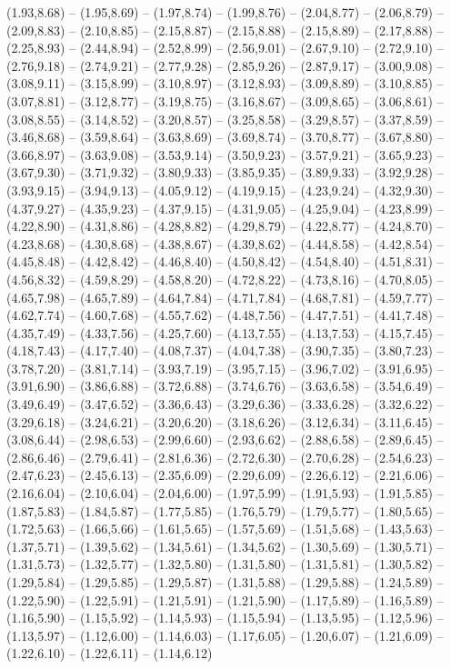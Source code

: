 \expandafter\def\csname geo:gebiet:DE-NW\endcsname{
  (1.93,8.68) -- (1.95,8.69) -- (1.97,8.74) -- (1.99,8.76) -- (2.04,8.77) -- (2.06,8.79) -- (2.09,8.83) -- (2.10,8.85) -- (2.15,8.87) -- (2.15,8.88) -- (2.15,8.89) -- (2.17,8.88) -- (2.25,8.93) -- (2.44,8.94) -- (2.52,8.99) -- (2.56,9.01) -- (2.67,9.10) -- (2.72,9.10) -- (2.76,9.18) -- (2.74,9.21) -- (2.77,9.28) -- (2.85,9.26) -- (2.87,9.17) -- (3.00,9.08) -- (3.08,9.11) -- (3.15,8.99) -- (3.10,8.97) -- (3.12,8.93) -- (3.09,8.89) -- (3.10,8.85) -- (3.07,8.81) -- (3.12,8.77) -- (3.19,8.75) -- (3.16,8.67) -- (3.09,8.65) -- (3.06,8.61) -- (3.08,8.55) -- (3.14,8.52) -- (3.20,8.57) -- (3.25,8.58) -- (3.29,8.57) -- (3.37,8.59) -- (3.46,8.68) -- (3.59,8.64) -- (3.63,8.69) -- (3.69,8.74) -- (3.70,8.77) -- (3.67,8.80) -- (3.66,8.97) -- (3.63,9.08) -- (3.53,9.14) -- (3.50,9.23) -- (3.57,9.21) -- (3.65,9.23) -- (3.67,9.30) -- (3.71,9.32) -- (3.80,9.33) -- (3.85,9.35) -- (3.89,9.33) -- (3.92,9.28) -- (3.93,9.15) -- (3.94,9.13) -- (4.05,9.12) -- (4.19,9.15) -- (4.23,9.24) -- (4.32,9.30) -- (4.37,9.27) -- (4.35,9.23) -- (4.37,9.15) -- (4.31,9.05) -- (4.25,9.04) -- (4.23,8.99) -- (4.22,8.90) -- (4.31,8.86) -- (4.28,8.82) -- (4.29,8.79) -- (4.22,8.77) -- (4.24,8.70) -- (4.23,8.68) -- (4.30,8.68) -- (4.38,8.67) -- (4.39,8.62) -- (4.44,8.58) -- (4.42,8.54) -- (4.45,8.48) -- (4.42,8.42) -- (4.46,8.40) -- (4.50,8.42) -- (4.54,8.40) -- (4.51,8.31) -- (4.56,8.32) -- (4.59,8.29) -- (4.58,8.20) -- (4.72,8.22) -- (4.73,8.16) -- (4.70,8.05) -- (4.65,7.98) -- (4.65,7.89) -- (4.64,7.84) -- (4.71,7.84) -- (4.68,7.81) -- (4.59,7.77) -- (4.62,7.74) -- (4.60,7.68) -- (4.55,7.62) -- (4.48,7.56) -- (4.47,7.51) -- (4.41,7.48) -- (4.35,7.49) -- (4.33,7.56) -- (4.25,7.60) -- (4.13,7.55) -- (4.13,7.53) -- (4.15,7.45) -- (4.18,7.43) -- (4.17,7.40) -- (4.08,7.37) -- (4.04,7.38) -- (3.90,7.35) -- (3.80,7.23) -- (3.78,7.20) -- (3.81,7.14) -- (3.93,7.19) -- (3.95,7.15) -- (3.96,7.02) -- (3.91,6.95) -- (3.91,6.90) -- (3.86,6.88) -- (3.72,6.88) -- (3.74,6.76) -- (3.63,6.58) -- (3.54,6.49) -- (3.49,6.49) -- (3.47,6.52) -- (3.36,6.43) -- (3.29,6.36) -- (3.33,6.28) -- (3.32,6.22) -- (3.29,6.18) -- (3.24,6.21) -- (3.20,6.20) -- (3.18,6.26) -- (3.12,6.34) -- (3.11,6.45) -- (3.08,6.44) -- (2.98,6.53) -- (2.99,6.60) -- (2.93,6.62) -- (2.88,6.58) -- (2.89,6.45) -- (2.86,6.46) -- (2.79,6.41) -- (2.81,6.36) -- (2.72,6.30) -- (2.70,6.28) -- (2.54,6.23) -- (2.47,6.23) -- (2.45,6.13) -- (2.35,6.09) -- (2.29,6.09) -- (2.26,6.12) -- (2.21,6.06) -- (2.16,6.04) -- (2.10,6.04) -- (2.04,6.00) -- (1.97,5.99) -- (1.91,5.93) -- (1.91,5.85) -- (1.87,5.83) -- (1.84,5.87) -- (1.77,5.85) -- (1.76,5.79) -- (1.79,5.77) -- (1.80,5.65) -- (1.72,5.63) -- (1.66,5.66) -- (1.61,5.65) -- (1.57,5.69) -- (1.51,5.68) -- (1.43,5.63) -- (1.37,5.71) -- (1.39,5.62) -- (1.34,5.61) -- (1.34,5.62) -- (1.30,5.69) -- (1.30,5.71) -- (1.31,5.73) -- (1.32,5.77) -- (1.32,5.80) -- (1.31,5.80) -- (1.31,5.81) -- (1.30,5.82) -- (1.29,5.84) -- (1.29,5.85) -- (1.29,5.87) -- (1.31,5.88) -- (1.29,5.88) -- (1.24,5.89) -- (1.22,5.90) -- (1.22,5.91) -- (1.21,5.91) -- (1.21,5.90) -- (1.17,5.89) -- (1.16,5.89) -- (1.16,5.90) -- (1.15,5.92) -- (1.14,5.93) -- (1.15,5.94) -- (1.13,5.95) -- (1.12,5.96) -- (1.13,5.97) -- (1.12,6.00) -- (1.14,6.03) -- (1.17,6.05) -- (1.20,6.07) -- (1.21,6.09) -- (1.22,6.10) -- (1.22,6.11) -- (1.14,6.12) }
